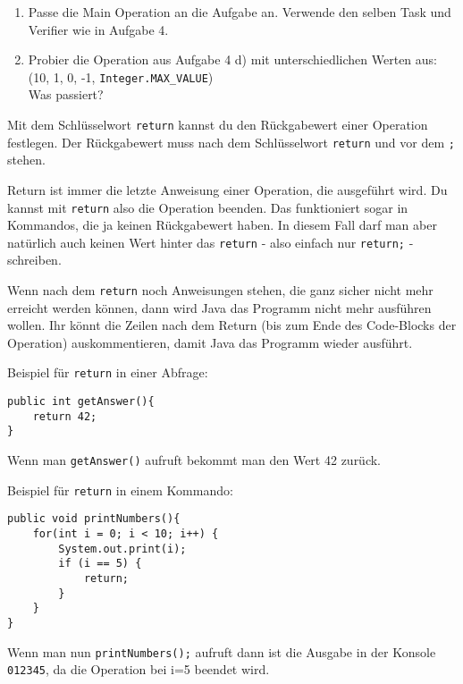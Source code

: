 
\begin{enumerate}
	\item
		Passe die Main Operation an die Aufgabe an.
		Verwende den selben Task und Verifier wie in Aufgabe 4.

	\item
		Probier die Operation aus Aufgabe 4 d) mit unterschiedlichen Werten aus: (10, 1, 0, -1, \lstinline{Integer.MAX_VALUE}) \\
		Was passiert?
\end{enumerate}


\begin{Infobox}[Return]
	Mit dem Schlüsselwort \lstinline{return} kannst du den Rückgabewert einer Operation festlegen.
	Der Rückgabewert muss nach dem Schlüsselwort \lstinline{return} und vor dem \lstinline{;} stehen.

	Return ist immer die letzte Anweisung einer Operation, die ausgeführt wird.
	Du kannst mit \lstinline{return} also die Operation beenden.
	Das funktioniert sogar in Kommandos, die ja keinen Rückgabewert haben.
	In diesem Fall darf man aber natürlich auch keinen Wert hinter das \lstinline{return} - also einfach nur \lstinline{return;} - schreiben.

	Wenn nach dem \lstinline{return} noch Anweisungen stehen, die ganz sicher nicht mehr erreicht werden können, dann wird Java das Programm nicht mehr ausführen wollen.
	Ihr könnt die Zeilen nach dem Return (bis zum Ende des Code-Blocks der Operation) auskommentieren, damit Java das Programm wieder ausführt.

	Beispiel für \lstinline{return} in einer Abfrage:

	\begin{lstlisting}[xleftmargin=0.5cm]
public int getAnswer(){
    return 42;
}
	\end{lstlisting}

	Wenn man \lstinline{getAnswer()} aufruft bekommt man den Wert 42 zurück.

	Beispiel für \lstinline{return} in einem Kommando:

	\begin{lstlisting}[xleftmargin=0.5cm]
public void printNumbers(){
    for(int i = 0; i < 10; i++) {
        System.out.print(i);
        if (i == 5) {
            return;
        }
    }
}
	\end{lstlisting}

	Wenn man nun \lstinline{printNumbers();} aufruft dann ist die Ausgabe in der Konsole \lstinline{012345}, da die Operation bei i=5 beendet wird.
\end{Infobox}


